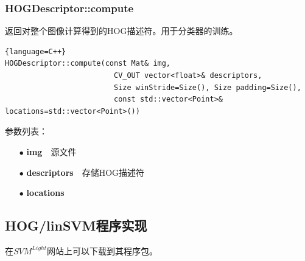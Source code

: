 \documentclass[10pt,technote,onecolumn,twoside]{IEEEtran}
\begin{document}
\subsubsection{HOGDescriptor::compute}
返回对整个图像计算得到的HOG描述符。用于分类器的训练。
\begin{lstlisting}{language=C++}
HOGDescriptor::compute(const Mat& img,
                         CV_OUT vector<float>& descriptors,
                         Size winStride=Size(), Size padding=Size(),
                         const std::vector<Point>& locations=std::vector<Point>())
\end{lstlisting}
参数列表：
\begin{enumerate}
\item[$\bullet$]\textbf{img}~~源文件
\item[$\bullet$]\textbf{descriptors}~~存储HOG描述符
\item[$\bullet$]\textbf{locations}~~
\end{enumerate}

\subsection{HOG/linSVM程序实现}
在$SVM^{Light}$网站上可以下载到其程序包。


%



\end{document}
